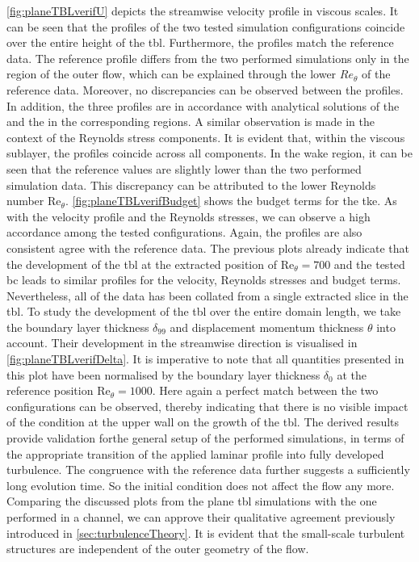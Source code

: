 \autoref{fig:planeTBLverifU} depicts the streamwise velocity profile in viscous scales.
It can be seen that the profiles of the two tested simulation configurations coincide over the entire height of the \acrshort{tbl}.
Furthermore, the profiles match the reference data.
The reference profile differs from the two performed simulations only in the region of the outer flow, which can be explained through the lower $Re_{\theta}$ of the reference data.
Moreover, no discrepancies can be observed between the profiles.
In addition, the three profiles are in accordance with analytical solutions of the  and the  in the corresponding regions.
A similar observation is made in the context of the Reynolds stress components.
It is evident that, within the viscous sublayer, the profiles coincide across all components.
In the wake region, it can be seen that the reference values are slightly lower than the two performed simulation data.  This discrepancy can be attributed to  the lower Reynolds number $\mathrm{Re}_{\theta}$.
\autoref{fig:planeTBLverifBudget} shows the budget terms for the \acrshort{tke}.
As with the velocity profile and the Reynolds stresses, we can observe a high accordance among the tested configurations.
Again, the profiles  are also consistent  agree with the reference data.
The previous plots already indicate that the development of the \acrshort{tbl} at the extracted position of $\mathrm{Re}_{\theta} = 700$ and the tested \acrshort{bc} leads to similar profiles for the velocity, Reynolds stresses and budget terms.
Nevertheless, all of the data has been collated from a single extracted slice in the \acrshort{tbl}.
To study the development of the \acrshort{tbl} over the entire domain length, we take the boundary layer thickness $\delta_{99}$ and displacement momentum thickness $\theta$ into account.
Their development in the streamwise direction is visualised in \autoref{fig:planeTBLverifDelta}.
It is imperative to note that all quantities presented in this plot have been  normalised by the boundary layer thickness $\delta_0$ at the reference position $\mathrm{Re}_{\theta} = 1000$.
Here again a perfect match between the two configurations can be observed,  thereby indicating that there is no visible  impact of the  condition at the upper wall on the growth of the \acrshort{tbl}.
The derived results  provide validation forthe general setup of the performed simulations, in terms of the appropriate  transition of the applied laminar profile into fully developed turbulence.
The congruence with the reference data further suggests  a sufficiently long evolution time. So the initial condition does not affect the flow any more.
Comparing the discussed plots from the plane \acrshort{tbl} simulations with the one performed in a channel, we can approve their qualitative agreement previously introduced in \autoref{sec:turbulenceTheory}.
It is evident that the small-scale turbulent structures are independent of the outer geometry of the flow.

